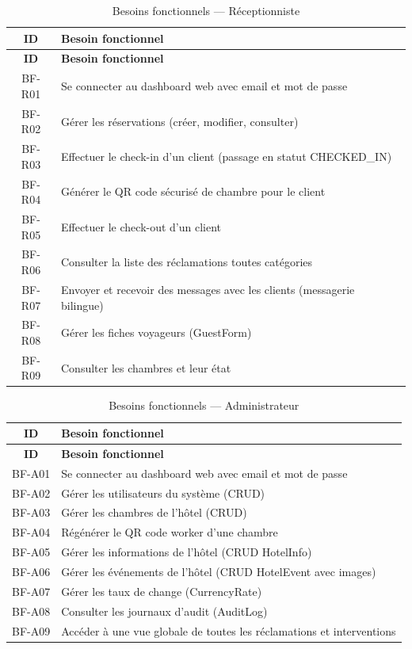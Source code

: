 \begin{longtable}{|c|p{12cm}|}
\caption{Besoins fonctionnels — Réceptionniste} \label{tab:bf_receptionniste} \\
\hline
\textbf{ID} & \textbf{Besoin fonctionnel} \\
\hline
\endfirsthead
\hline
\textbf{ID} & \textbf{Besoin fonctionnel} \\
\hline
\endhead
BF-R01 & Se connecter au dashboard web avec email et mot de passe \\
\hline
BF-R02 & Gérer les réservations (créer, modifier, consulter) \\
\hline
BF-R03 & Effectuer le check-in d'un client (passage en statut CHECKED\_IN) \\
\hline
BF-R04 & Générer le QR code sécurisé de chambre pour le client \\
\hline
BF-R05 & Effectuer le check-out d'un client \\
\hline
BF-R06 & Consulter la liste des réclamations toutes catégories \\
\hline
BF-R07 & Envoyer et recevoir des messages avec les clients (messagerie bilingue) \\
\hline
BF-R08 & Gérer les fiches voyageurs (GuestForm) \\
\hline
BF-R09 & Consulter les chambres et leur état \\
\hline
\end{longtable}

\begin{longtable}{|c|p{12cm}|}
\caption{Besoins fonctionnels — Administrateur} \label{tab:bf_admin} \\
\hline
\textbf{ID} & \textbf{Besoin fonctionnel} \\
\hline
\endfirsthead
\hline
\textbf{ID} & \textbf{Besoin fonctionnel} \\
\hline
\endhead
BF-A01 & Se connecter au dashboard web avec email et mot de passe \\
\hline
BF-A02 & Gérer les utilisateurs du système (CRUD) \\
\hline
BF-A03 & Gérer les chambres de l'hôtel (CRUD) \\
\hline
BF-A04 & Régénérer le QR code worker d'une chambre \\
\hline
BF-A05 & Gérer les informations de l'hôtel (CRUD HotelInfo) \\
\hline
BF-A06 & Gérer les événements de l'hôtel (CRUD HotelEvent avec images) \\
\hline
BF-A07 & Gérer les taux de change (CurrencyRate) \\
\hline
BF-A08 & Consulter les journaux d'audit (AuditLog) \\
\hline
BF-A09 & Accéder à une vue globale de toutes les réclamations et interventions \\
\hline
\end{longtable}

